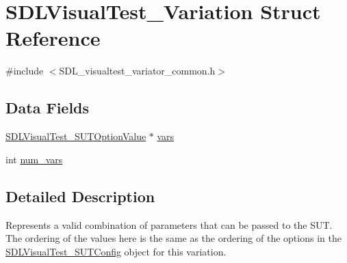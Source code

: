 \hypertarget{struct_s_d_l_visual_test___variation}{\section{S\-D\-L\-Visual\-Test\-\_\-\-Variation Struct Reference}
\label{struct_s_d_l_visual_test___variation}
}


{\ttfamily \#include $<$S\-D\-L\-\_\-visualtest\-\_\-variator\-\_\-common.\-h$>$}

\subsection*{Data Fields}
\begin{DoxyCompactItemize}
\item 
\hyperlink{union_s_d_l_visual_test___s_u_t_option_value}{S\-D\-L\-Visual\-Test\-\_\-\-S\-U\-T\-Option\-Value} $\ast$ \hyperlink{struct_s_d_l_visual_test___variation_a1eab2e90f0195b4f4632eb19523aeadf}{vars}
\item 
int \hyperlink{struct_s_d_l_visual_test___variation_a2daded0b80f9ab7ed3703cc2686e5a92}{num\-\_\-vars}
\end{DoxyCompactItemize}


\subsection{Detailed Description}
Represents a valid combination of parameters that can be passed to the S\-U\-T. The ordering of the values here is the same as the ordering of the options in the \hyperlink{struct_s_d_l_visual_test___s_u_t_config}{S\-D\-L\-Visual\-Test\-\_\-\-S\-U\-T\-Config} object for this variation. 


